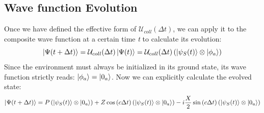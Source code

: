 \documentclass[a4paper,12pt]{article}
\begin{document}
\subsection{Wave function Evolution}
\label{sub:Wave_function_Evolution}

Once we have defined the effective form of $ \mathcal{U}_{coll}(\Delta t) $, we can apply it to the composite wave function at a certain time \textit{t} to calculate its evolution: 
\begin{equation}
	\ket{\Psi(t + \Delta t)} = \mathcal{U}_{coll}(\Delta t) \ket{\Psi (t)} =  \mathcal{U}_{coll}(\Delta t) \left(\ket{\psi_{S} (t)} \otimes \ket{\phi_{a}}\right)
\end{equation}
Since the environment must always be initialized in its ground state, its wave function strictly reads: $ \ket{\phi_{a}} = \ket{0_{a}} $. \newline
Now we can explicitly calculate the evolved state: 
\begin{equation}
	\ket{\Psi(t + \Delta t)} = P \left(\ket{\psi_{S} (t)} \otimes \ket{0_{a}} \right) + Z \cos \left(c \Delta t\right) \left(\ket{\psi_{S} (t)} \otimes \ket{0_{a}} \right) -i \frac{X}{2} \sin \left(c \Delta t\right) \left(\ket{\psi_{S} (t)} \otimes \ket{0_{a}} \right)
\end{equation}
\end{document}
